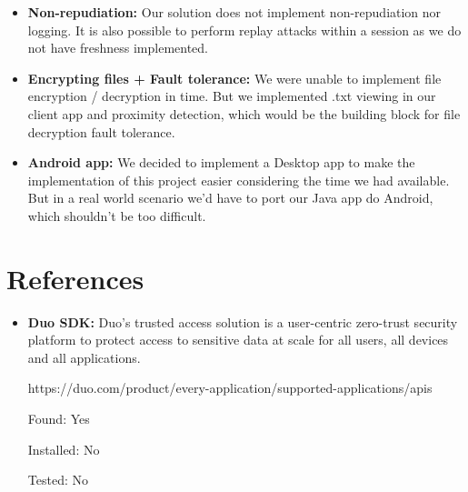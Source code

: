 \documentclass[12pt]{article}
\begin{document}
\begin{itemize}
    \item \textbf{Non-repudiation:}
    Our solution does not implement non-repudiation nor logging. It is also possible to perform replay attacks within a session as we do not have freshness implemented.
    
    \item \textbf{Encrypting files + Fault tolerance:}
    We were unable to implement file encryption / decryption in time. But we implemented .txt viewing in our client app and proximity detection, which would be the building block for file decryption fault tolerance.
    
    \item \textbf{Android app:}
    We decided to implement a Desktop app to make the implementation of this project easier considering the time we had available. But in a real world scenario we'd have to port our Java app do Android, which shouldn't be too difficult.
    
\end{itemize}

\section{References}

\begin{itemize}
  \item \textbf{Duo SDK:} Duo's trusted access solution is a user-centric zero-trust security platform to protect access to sensitive data at scale for all users, all devices and all applications.\par https://duo.com/product/every-application/supported-applications/apis\par
  Found: Yes\par
  Installed: No\par
  Tested: No\par
\end{itemize}
\end{document}
